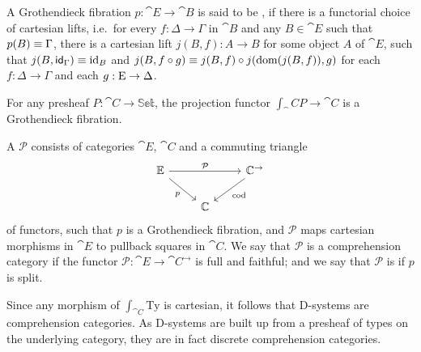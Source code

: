 \begin{defn}
A Grothendieck fibration $p:\cat{E}\to\cat{B}$ is said to be , if
there is a functorial choice of cartesian lifts, i.e.~for every $f:\Delta\to \Gamma$ in 
$\cat{B}$ and any $B\in \cat{E}$ such that $p(B)\jdeq \Gamma$,
there is a cartesian lift $j(B,f):A \to B$ for some object $A$ of $\cat{E}$, such that 
$j(B,\idfunc[\Gamma])\jdeq\catid{B}$ and 
$j(B, f\circ g)\jdeq j(B,f)\circ j(\mathrm{dom}(j(B,f)),g)$ for each
$f:\Delta\to\Gamma$ and each $g:\greek{E}\to\Delta$. 
\end{defn}

\begin{eg}
For any presheaf $P:\cat{C}\to\mathbb{Set}$, the projection functor
$\int_\cat{C} P\to\cat{C}$ is a Grothendieck fibration.
\end{eg}

\begin{defn}
A  $\mathcal{P}$ consists of categories $\cat{E}$, $\cat{C}$ and a
commuting triangle
\begin{equation*}
\begin{tikzcd}
\cat{E} \arrow[rr,"\mathcal{P}"] \arrow[dr,swap,"p"] & & \cat{C}^{\to} \arrow[dl,"\mathrm{cod}"] \\
& \cat{C}
\end{tikzcd}
\end{equation*}
of functors, such that $p$ is a Grothendieck fibration, and $\mathcal{P}$ maps
cartesian morphisms in $\cat{E}$ to pullback squares in $\cat{C}$. We say that
$\mathcal{P}$ is a  comprehension category if the functor $\mathcal{P}:
\cat{E}\to\cat{C}^{\to}$ is full and faithful; and we say that
$\mathcal{P}$ is  if $p$ is split.
\end{defn}

\begin{eg}
Since any morphism of $\int_{\cat{C}}\mathrm{Ty}$ is cartesian, it follows that D-systems
are comprehension categories. As D-systems are built up from a presheaf of types
on the underlying category, they are in fact discrete comprehension categories.
\end{eg}

